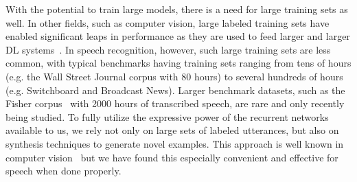 With the potential to train large models, there is a need for large training
sets as well. In other fields, such as computer vision, large labeled training
sets have enabled significant leaps in performance as they are used to feed
larger and larger DL systems~\cite{szegedy2015, krizhevsky2012imagenet}. In
speech recognition, however, such large training sets are less common, with
typical benchmarks having training sets ranging from tens of hours (e.g. the
Wall Street Journal corpus with 80 hours) to several hundreds of hours (e.g.
Switchboard and Broadcast News). Larger benchmark datasets, such as the Fisher
corpus~\cite{cieri2004fisher} with 2000 hours of transcribed speech, are rare
and only recently being studied. To fully utilize the expressive power of the
recurrent networks available to us, we rely not only on large sets of labeled
utterances, but also on synthesis techniques to generate novel examples. This
approach is well known in computer vision~\cite{sapp2008, lecun2004,
coates2011} but we have found this especially convenient and effective for
speech when done properly.
